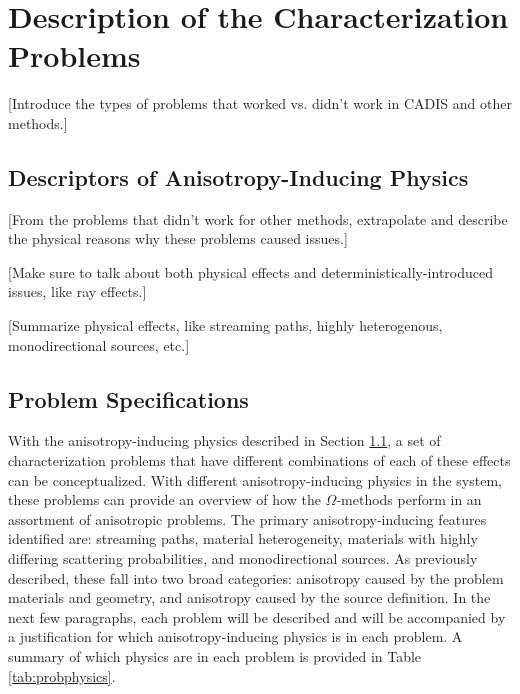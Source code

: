 \section{Description of the Characterization Problems}
\label{sec:AngleProbDesc}

[Introduce the types of problems that worked vs. didn't work in CADIS and other
methods.] \\

\subsection{Descriptors of Anisotropy-Inducing Physics}
\label{subsec:AngleProbDescriptors}

[From the problems that didn't work for other methods, extrapolate and describe
the physical reasons why these problems caused issues.]

[Make sure to talk about both physical effects and deterministically-introduced
issues, like ray effects.]

[Summarize physical effects, like streaming paths, highly heterogenous,
monodirectional sources, etc.]

\subsection{Problem Specifications}
\label{subsec:ProbSpecs}

With the anisotropy-inducing physics described in Section
\ref{subsec:AngleProbDescriptors}, a set of characterization problems that have
different combinations of each of these effects can be conceptualized. With
different anisotropy-inducing physics in the system, these problems can provide
an overview of how the $\Omega$-methods perform in an assortment of anisotropic
problems. The primary anisotropy-inducing features identified are: streaming
paths, material heterogeneity, materials with highly differing scattering
probabilities, and monodirectional sources. As previously described, these fall
into two broad categories: anisotropy caused by the problem materials and
geometry, and anisotropy caused by the source definition. In the next few
paragraphs, each problem will be described and will be accompanied by
a justification for which
anisotropy-inducing physics is in each problem. A summary of which physics are
in each problem is provided in Table \ref{tab:probphysics}.



